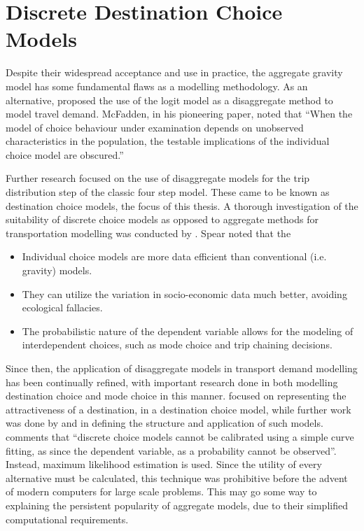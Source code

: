 \section{Discrete Destination Choice Models}
Despite their widespread acceptance and use in practice, the aggregate gravity model has some fundamental flaws as a modelling methodology. As an alternative, \textcite*{McFadden73, Akiva74} proposed the use of the logit model as a disaggregate method to model travel demand. McFadden, in his pioneering paper, noted that \enquote{When the model of choice behaviour under examination depends on unobserved characteristics in the population, the testable implications of the individual choice model are obscured.}\parencite{McFadden73}

Further research focused on the use of disaggregate models for the trip distribution step of the classic four step model. These came to be known as destination choice models, the focus of this thesis. A thorough investigation of the suitability of discrete choice models as opposed to aggregate methods for transportation modelling was conducted by \textcite{Spear77}. Spear noted that the 
\begin{itemize}
\item Individual choice models are more data efficient than conventional (i.e. gravity) models.
\item They can utilize the variation in socio-economic data much better, avoiding ecological fallacies.
\item The probabilistic nature of the dependent variable allows for the modeling of interdependent choices, such as mode choice and trip chaining decisions. 
\end{itemize}
	
Since then, the application of disaggregate models in transport demand modelling has been continually refined, with important research done in both modelling destination choice and mode choice in this manner. \textcite{Daly82} focused on representing the attractiveness of a destination, in a destination choice model, while further work was done by \textcite{Akiva74} and \textcite{Anas81} in defining the structure and application of such models. \textcite{Train09} comments that \enquote{discrete choice models cannot be calibrated using a simple curve fitting, as since the dependent variable, as a probability cannot be observed}. Instead, maximum likelihood estimation is used. Since the utility of every alternative must be calculated, this technique was prohibitive before the advent of modern computers for large scale problems. This may go some way to explaining the persistent popularity of aggregate models, due to their simplified computational requirements.

